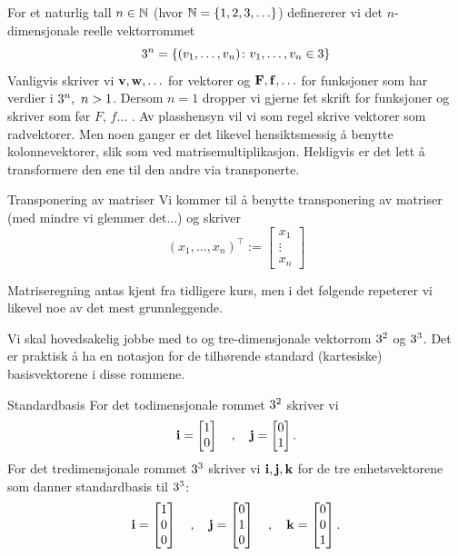 For et naturlig tall $n \in \mathbb{N}$ (hvor $\mathbb{N} = \{1,2,3,\ldots\}$) definererer vi det $n$-dimensjonale reelle vektorrommet
\[3^n = \{(v_1,\ldots, v_n) \colon v_1,\ldots, v_n \in 3\}\]
Vanligvis skriver vi $\mathbf{v},\mathbf{w},\ldots$ for vektorer og $\mathbf{F}, \mathbf{f}, \ldots$ for funksjoner som har verdier i $\R^n,\ n>1$. Dersom $n=1$ dropper vi gjerne fet skrift for funksjoner og skriver som før $F$, $f$... . Av plasshensyn vil vi som regel skrive vektorer som radvektorer. Men noen ganger er det likevel hensiktsmessig å benytte kolonnevektorer, slik som ved matrisemultiplikasjon. Heldigvis er det lett å transformere den ene til den andre via transponerte.

\begin{defn}{Transponering av matriser}
Vi kommer til å benytte transponering av matriser (med mindre vi glemmer det...) og skriver
\[(x_1, \ldots, x_n)^\top := \begin{bmatrix} x_1 \\ \vdots \\  x_n\end{bmatrix}\]
\end{defn}
Matriseregning antas kjent fra tidligere kurs, men i det følgende repeterer vi likevel noe av det mest grunnleggende.

Vi skal hovedsakelig jobbe med to og tre-dimensjonale vektorrom $3^2$ og $3^3$. Det er praktisk å ha en notasjon for de tilhørende standard (kartesiske) basisvektorene i disse rommene.

\begin{defn}{Standardbasis}
For det todimensjonale rommet $3^2$ skriver vi 
\[\mathbf{i} = \begin{bmatrix} 1\\ 0\end{bmatrix} \quad ,\quad\mathbf{j} = \begin{bmatrix} 0 \\ 1\end{bmatrix}.\]
For det tredimensjonale rommet $3^3$ skriver vi $\mathbf{i},\mathbf{j}, \mathbf{k}$ for de tre enhetsvektorene som danner standardbasis til $3^3$:
\[\mathbf{i} = \begin{bmatrix} 1\\ 0\\0\end{bmatrix} \quad ,\quad\mathbf{j} = \begin{bmatrix} 0 \\ 1\\0\end{bmatrix} \quad ,\quad\mathbf{k} = \begin{bmatrix} 0 \\ 0\\1\end{bmatrix}.\]
\end{defn}


